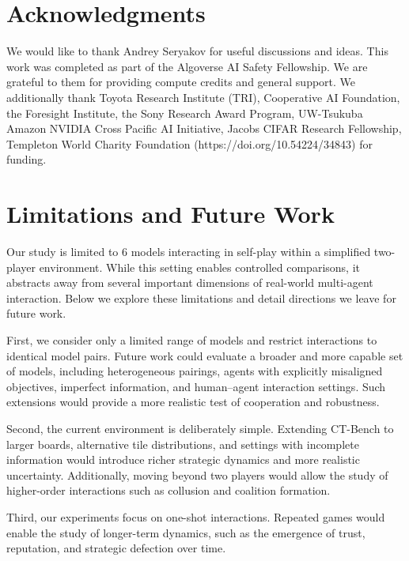 \documentclass{article} %
\newcommand{\CT}{CT-Bench\xspace}
\begin{document}
%
%
%

%
%
%

\FloatBarrier





\appendix
\FloatBarrier
\section{Acknowledgments}
\label{appendix:Acknowledgments}
We would like to thank Andrey Seryakov for useful discussions and ideas. This work was completed as part of the Algoverse AI Safety Fellowship. We are grateful to them for providing compute credits and general support. We additionally thank Toyota Research Institute (TRI), Cooperative AI Foundation, the Foresight Institute, the Sony Research Award Program, UW-Tsukuba Amazon NVIDIA Cross Pacific AI Initiative, Jacobs CIFAR Research Fellowship, Templeton World Charity Foundation (https://doi.org/10.54224/34843) for funding.

\section{Limitations and Future Work}
\label{appendix:future}


Our study is limited to $6$ models interacting in self-play within a simplified two-player environment. While this setting enables controlled comparisons, it abstracts away from several important dimensions of real-world multi-agent interaction. Below we explore these limitations and detail directions we leave for future work.

First, we consider only a limited range of models and restrict interactions to identical model pairs. Future work could evaluate a broader and more capable set of models, including heterogeneous pairings, agents with explicitly misaligned objectives, imperfect information, and human–agent interaction settings. Such extensions would provide a more realistic test of cooperation and robustness. 

Second, the current environment is deliberately simple. Extending \CT to larger boards, alternative tile distributions, and settings with incomplete information would introduce richer strategic dynamics and more realistic uncertainty. Additionally, moving beyond two players would allow the study of higher-order interactions such as collusion and coalition formation.

Third, our experiments focus on one-shot interactions. Repeated games would enable the study of longer-term dynamics, such as the emergence of trust, reputation, and strategic defection over time.
\end{document}
